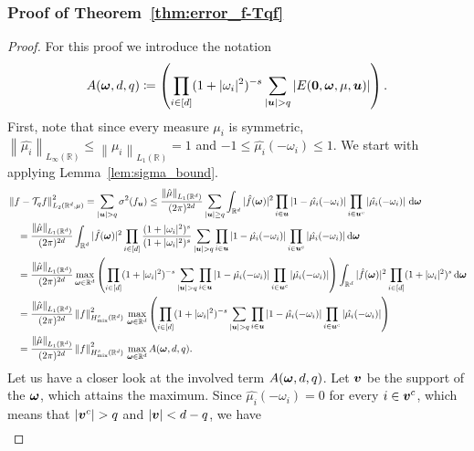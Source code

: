 \documentclass{article}
\renewcommand{\vec}[1]{\ensuremath \mathbf{\boldsymbol{#1}}}
\newcommand{\w}{\ensuremath{\vec \omega}}
\newcommand{\R}{\ensuremath{\mathbb{R}}}
\newcommand{\mix}{\mathrm{mix}}
\renewcommand{\d}{\, \mathrm{d}}
\newcommand{\norm}[1]{\left\lVert {#1} \right\rVert}    %
\newcommand{\TT}{\mathcal T}				%
\theoremstyle{definition}
\numberwithin{equation}{section}
\begin{document}
\subsubsection*{Proof of Theorem~\ref{thm:error_f-Tqf}}
\begin{proof}
For this proof we introduce the notation
\begin{equation}\label{eq:def_A}
A(\w,d,q) \coloneqq \left( \prod_{i\in [d]} (1+|\omega_i|^2)^{-s}  \sum_{|\vec u|> q}|E(\vec 0,\w,\mu,\vec u)| \right).
\end{equation}
First, note that since every measure $\mu_i$ is symmetric, $\norm{\hat{\mu_i}}_{L_\infty(\R)} \leq \norm{\mu_i}_{L_1(\R)} = 1$ and $-1\leq\hat{\mu_i}(-\omega_i)\leq 1$. We start with applying Lemma~\ref{lem:sigma_bound}.
\begin{align}
&\norm{f-\TT_{q}f}_{L_2(\R^d,\mu)}^2 = \sum_{|\vec u|> q} \sigma^2(f_{\vec u}) 
\leq \frac{\norm{\hat{\mu}}_{L_1(\R^d)}}{(2\pi)^{2d}} \sum_{|\vec u|\geq q}\int_{\R^d}| \hat{f}(\w)|^2
 \prod_{i\in \vec  u}\left|1-\hat{\mu_i}(-\omega_i)\right| \prod_{i\in \vec  u^c}\left|\hat{\mu_i}(-\omega_i)\right| \d \w \notag\\
&\quad=\frac{\norm{\hat{\mu}}_{L_1(\R^d)}}{(2\pi)^{2d}}\int_{\R^d}| \hat{f}(\w)|^2\prod_{i\in [d]}\frac{(1+|\omega_i|^2)^s}{(1+|\omega_i|^2)^s}
 \sum_{|\vec u|> q}\prod_{i\in \vec  u}|1-\hat{\mu_i}(-\omega_i)| \prod_{i\in \vec  u^c}|\hat{\mu_i}(-\omega_i)| \d \w \notag\\
&\quad=\frac{\norm{\hat{\mu}}_{L_1(\R^d)}}{(2\pi)^{2d}}\max_{\w\in \R^d}\left( \prod_{i\in [d]} (1+|\omega_i|^2)^{-s}  \sum_{|\vec u|> q}\prod_{i\in \vec  u}|1-\hat{\mu_i}(-\omega_i)| \prod_{i\in \vec  u^c}|\hat{\mu_i}(-\omega_i) |\right)
\int_{\R^d}| \hat{f}(\w)|^2\prod_{i\in [d]}(1+|\omega_i|^2)^s\d \w \notag
  \\
	&\quad=\frac{\norm{\hat{\mu}}_{L_1(\R^d)}}{(2\pi)^{2d}}\norm{f}^2_{H^s_{\mix}(\R^d)} \,\max_{\w\in \R^d}\left( \prod_{i\in [d]} (1+|\omega_i|^2)^{-s}  \sum_{|\vec u|> q}\prod_{i\in \vec  u}|1-\hat{\mu_i}(-\omega_i)| \prod_{i\in \vec  u^c}|\hat{\mu_i}(-\omega_i)| \right) \notag \\
	&\quad=\frac{\norm{\hat{\mu}}_{L_1(\R^d)}}{(2\pi)^{2d}}\norm{f}^2_{H^s_{\mix}(\R^d)} \,\max_{\w\in \R^d}A(\w,d,q).
\end{align}
Let us have a closer look at the involved term $A(\w,d,q)$. Let $\vec v$ be the support of the $\w$, which attains the maximum. Since $\hat{\mu_i}(-\omega_i)= 0 $ for every $i\in \vec v^c$, which means that $|\vec v^c|>q$ and $|\vec v|<d-q$, we have
\begin{align*}

\end{align*}
\end{proof}
\end{document}
